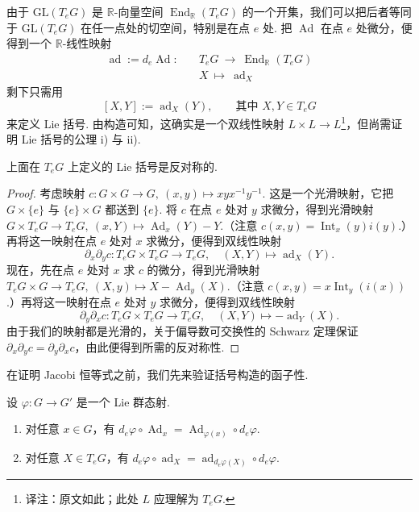 \begin{numpara}[括号的构造]\label{np:lie-1-5-3}
由于 $\mathrm{GL}(T_eG)$ 是 $\mathbb{R}$-向量空间 $\operatorname{End}_{\mathbb{R}}(T_eG)$ 的一个开集，我们可以把后者等同于 $\mathrm{GL}(T_eG)$ 在任一点处的切空间，特别是在点 $e$ 处. 把 $\operatorname{Ad}$ 在点 $e$ 处微分，便得到一个 $\mathbb{R}$-线性映射
\[
\begin{aligned}
\operatorname{ad}:=d_e\operatorname{Ad}:\quad &T_eG\ \longrightarrow\ \operatorname{End}_{\mathbb{R}}(T_eG)\\
&X\ \longmapsto\ \operatorname{ad}_X
\end{aligned}
\]
剩下只需用
\[
[X,Y]:=\operatorname{ad}_X(Y),\qquad \text{其中 } X,Y\in T_eG
\]
来定义 Lie 括号.
由构造可知，这确实是一个双线性映射 $L\times L\longrightarrow L$\footnote{译注：原文如此；此处 $L$ 应理解为 $T_eG$.}，但尚需证明 Lie 括号的公理 i) 与 ii).
\end{numpara}

\begin{proposition}\label{prop:lie-1-5-4}
上面在 $T_eG$ 上定义的 Lie 括号是反对称的.
\end{proposition}

\begin{proof}
考虑映射 $c:G\times G\longrightarrow G,\ (x,y)\mapsto xyx^{-1}y^{-1}$. 这是一个光滑映射，它把 $G\times\{e\}$ 与 $\{e\}\times G$ 都送到 $\{e\}$.
将 $c$ 在点 $e$ 处对 $y$ 求微分，得到光滑映射 $G\times T_eG\longrightarrow T_eG,\ (x,Y)\mapsto\operatorname{Ad}_x(Y)-Y$.（注意 $c(x,y)=\operatorname{Int}_x(y)i(y)$.）再将这一映射在点 $e$ 处对 $x$ 求微分，便得到双线性映射
\[
\partial_x\partial_yc:T_eG\times T_eG\longrightarrow T_eG,\quad (X,Y)\mapsto\operatorname{ad}_X(Y).
\]
现在，先在点 $e$ 处对 $x$ 求 $c$ 的微分，得到光滑映射 $T_eG\times G\longrightarrow T_eG,\ (X,y)\mapsto X-\operatorname{Ad}_y(X)$.（注意 $c(x,y)=x\operatorname{Int}_y(i(x))$.）再将这一映射在点 $e$ 处对 $y$ 求微分，便得到双线性映射
\[
\partial_y\partial_xc:T_eG\times T_eG\longrightarrow T_eG,\quad (X,Y)\mapsto-\operatorname{ad}_Y(X).
\]
由于我们的映射都是光滑的，关于偏导数可交换性的 Schwarz 定理保证 $\partial_x\partial_yc=\partial_y\partial_xc$，由此便得到所需的反对称性.
\end{proof}

在证明 Jacobi 恒等式之前，我们先来验证括号构造的函子性.

\begin{proposition}\label{prop:lie-1-5-5}
设 $\varphi:G\longrightarrow G'$ 是一个 Lie 群态射.
\begin{enumerate}[label=\roman*)]
\item 对任意 $x\in G$，有 $d_e\varphi\circ\operatorname{Ad}_x=\operatorname{Ad}_{\varphi(x)}\circ d_e\varphi$.
\item 对任意 $X\in T_eG$，有 $d_e\varphi\circ\operatorname{ad}_X=\operatorname{ad}_{d_e\varphi(X)}\circ d_e\varphi$.
\end{enumerate}
\end{proposition}


